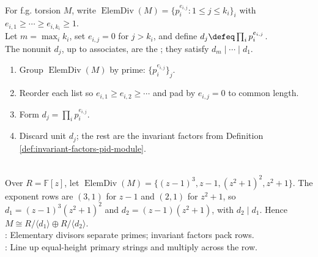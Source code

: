 \begin{definition} \label{def:invariant-factors-pid-module} \\
For f.g. torsion $M$, write $\operatorname{ElemDiv}(M)=\{p_i^{e_{i,j}}:1\leq j\leq k_i\}_i$ with $e_{i,1}\geq\cdots\geq e_{i,k_i}\geq1$.\\
Let $m=\max_i k_i$, set $e_{i,j}=0$ for $j>k_i$, and define $d_j\defeq\prod_i p_i^{e_{i,j}}$.\\
The nonunit $d_j$, up to associates, are the ; they satisfy $d_m\mid\cdots\mid d_1$.
\end{definition}

\begin{method} \label{meth:elementary-divisors-to-invariant-factors} 
\begin{enumerate}[label=(\roman*)]
\setlength{\itemsep}{0pt}
\item Group $\operatorname{ElemDiv}(M)$ by prime: $\{p_i^{e_{i,j}}\}_j$.
\item Reorder each list so $e_{i,1}\geq e_{i,2}\geq\cdots$ and pad by
$e_{i,j}=0$ to common length.
\item Form $d_j=\prod_i p_i^{e_{i,j}}$.
\item Discard unit $d_j$; the rest are the invariant factors from Definition
\ref{def:invariant-factors-pid-module}.
\end{enumerate}
\end{method}

\begin{example} \label{ex:elementary-divisors-to-invariant-factors-polynomial-module} \\
Over $R=\mathbb{F}[z]$, let $\operatorname{ElemDiv}(M)=\{(z-1)^3,z-1,(z^2+1)^2,z^2+1\}$. The exponent rows are $(3,1)$ for $z-1$ and $(2,1)$ for $z^2+1$, so $d_1=(z-1)^3(z^2+1)^2$ and $d_2=(z-1)(z^2+1)$, with $d_2\mid d_1$. Hence $M\cong R/\langle d_1\rangle\oplus R/\langle d_2\rangle$.\\
: Elementary divisors separate primes; invariant factors pack rows.\\
: Line up equal-height primary strings and multiply across the row.
\end{example}

